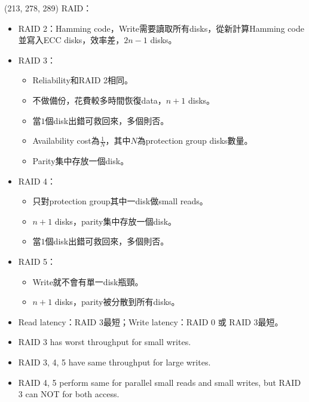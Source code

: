 \item \begin{theorem}{(213, 278, 289)} RAID：\begin{itemize}
        \item RAID 2：Hamming code，Write需要讀取所有disks，從新計算Hamming code並寫入ECC disks，效率差，$2n - 1$ disks。
        \item RAID 3：\begin{itemize}
            \item Reliability和RAID 2相同。
            \item 不做備份，花費較多時間恢復data，$n + 1$ disks。
            \item 當$1$個disk出錯可救回來，多個則否。
            \item Availability cost為$\frac{1}{N}$，其中$N$為protection group disks數量。
            \item Parity集中存放一個disk。
        \end{itemize}
        \item RAID 4：\begin{itemize}
            \item 只對protection group其中一disk做small reads。
            \item $n + 1$ disks，parity集中存放一個disk。
            \item 當$1$個disk出錯可救回來，多個則否。
        \end{itemize}
        \item RAID 5：\begin{itemize}
            \item Write就不會有單一disk瓶頸。
            \item $n + 1$ disks，parity被分散到所有disks。
        \end{itemize}
        \item Read latency：RAID 3最短；Write latency：RAID 0 或 RAID 3最短。
        \item RAID 3 has worst throughput for small writes.
        \item RAID 3, 4, 5 have same throughput for large writes.
        \item RAID 4, 5 perform same for parallel small reads and small writes, but RAID 3 can NOT for both access.
    \end{itemize}
\end{theorem}